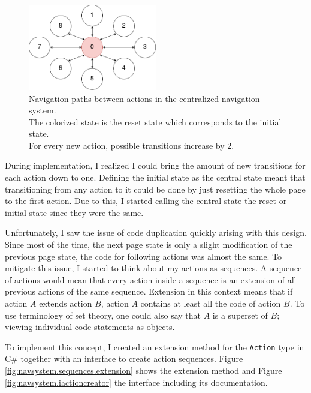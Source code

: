 \begin{figure}
\centering
\caption[Navigation paths in centralized navigation system]{Navigation paths between actions in the centralized navigation system. \\The colorized state is the reset state which corresponds to the initial state.\\For every new action, possible transitions increase by 2.}
\label{fig:navsystem.central.overview}
\includegraphics[width=0.5\textwidth]{figures/navigationsystem-diagram/navigationsystem-central-overview.png}
\end{figure}

During implementation, I realized I could bring the amount of new transitions for each action down to one. Defining the initial state as the central state meant that transitioning from any action to it could be done by just resetting the whole page to the first action. Due to this, I started calling the central state the reset or initial state since they were the same.

Unfortunately, I saw the issue of code duplication quickly arising with this design. Since most of the time, the next page state is only a slight modification of the previous page state, the code for following actions was almost the same. To mitigate this issue, I started to think about my actions as sequences. A sequence of actions would mean that every action inside a sequence is an extension of all previous actions of the same sequence. Extension in this context means that if action $A$ extends action $B$, action $A$ contains at least all the code of action $B$. To use terminology of set theory, one could also say that $A$ is a superset of $B$; viewing individual code statements as objects.

To implement this concept, I created an extension method for the \texttt{Action} type in C\# together with an interface to create action sequences. Figure \ref{fig:navsystem.sequences.extension} shows the extension method and Figure \ref{fig:navsystem.iactioncreator} the interface including its documentation.

